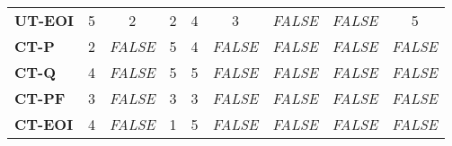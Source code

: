 \documentclass[final_report_innit.tex]{subfiles}
\begin{document}
\begin{table}[h]
\begin{tabular}[b]{l | c | c | c | c | c | c | c | c}
	\textbf{UT-EOI} & 5 & 2 & 2 & 4 & 3 & \textit{FALSE} & \textit{FALSE} & 5 \\ %
	\textbf{CT-P} & 2 & \textit{FALSE} & 5 & 4 & \textit{FALSE} & \textit{FALSE} & \textit{FALSE} & \textit{FALSE} \\ %
	\textbf{CT-Q} & 4 & \textit{FALSE} & 5 & 5 & \textit{FALSE} & \textit{FALSE} & \textit{FALSE} & \textit{FALSE} \\ %
	\textbf{CT-PF} & 3 & \textit{FALSE} & 3 & 3 & \textit{FALSE} & \textit{FALSE} & \textit{FALSE} & \textit{FALSE} \\ %
	\textbf{CT-EOI} & 4 & \textit{FALSE} & 1 & 5 & \textit{FALSE} & \textit{FALSE} & \textit{FALSE} & \textit{FALSE} \\ %
\end{tabular}
\end{table}
\end{document}
